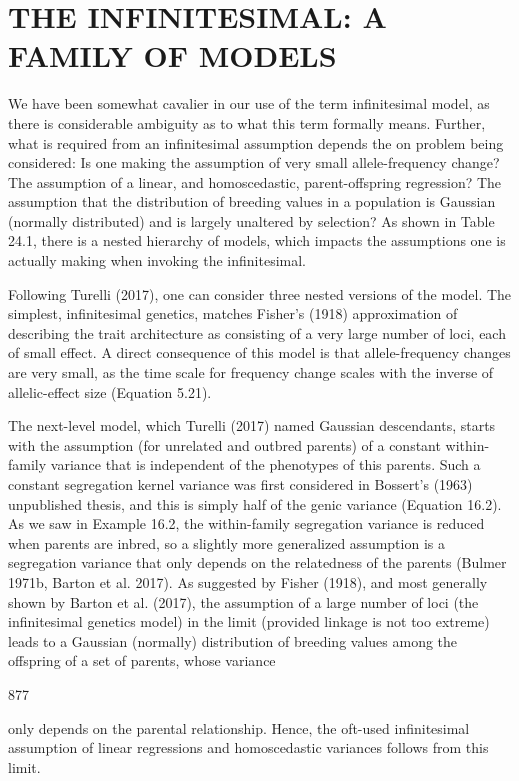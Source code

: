 \documentclass{article}
\begin{document}
\section{THE INFINITESIMAL: A FAMILY OF MODELS}
We have been somewhat cavalier in our use of the term infinitesimal model, as there is considerable ambiguity as to what this term formally means. Further, what is required from an infinitesimal assumption depends the on problem being considered: Is one making the assumption of very small allele-frequency change? The assumption of a linear, and homoscedastic, parent-offspring regression? The assumption that the distribution of breeding values in a population is Gaussian (normally distributed) and is largely unaltered by selection? As shown in Table 24.1, there is a nested hierarchy of models, which impacts the assumptions one is actually making when invoking the infinitesimal.

Following Turelli (2017), one can consider three nested versions of the model. The simplest, infinitesimal genetics, matches Fisher's (1918) approximation of describing the trait architecture as consisting of a very large number of loci, each of small effect. A direct consequence of this model is that allele-frequency changes are very small, as the time scale for frequency change scales with the inverse of allelic-effect size (Equation 5.21).

The next-level model, which Turelli (2017) named Gaussian descendants, starts with the assumption (for unrelated and outbred parents) of a constant within-family variance that is independent of the phenotypes of this parents. Such a constant segregation kernel variance was first considered in Bossert's (1963) unpublished thesis, and this is simply half of the genic variance (Equation 16.2). As we saw in Example 16.2, the within-family segregation variance is reduced when parents are inbred, so a slightly more generalized assumption is a segregation variance that only depends on the relatedness of the parents (Bulmer 1971b, Barton et al. 2017). As suggested by Fisher (1918), and most generally shown by Barton et al. (2017), the assumption of a large number of loci (the infinitesimal genetics model) in the limit (provided linkage is not too extreme) leads to a Gaussian (normally) distribution of breeding values among the offspring of a set of parents, whose variance

877

only depends on the parental relationship. Hence, the oft-used infinitesimal assumption of linear regressions and homoscedastic variances follows from this limit.
\end{document}
